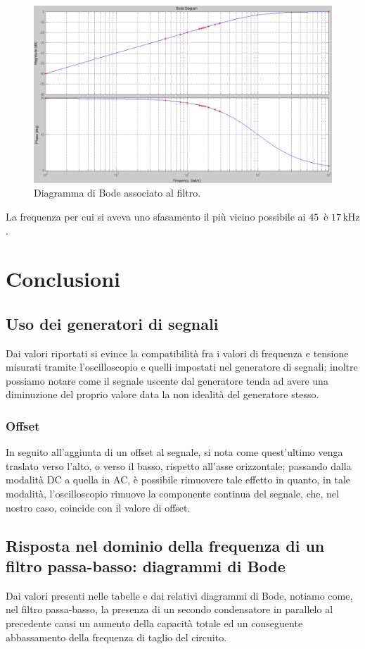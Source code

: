 \documentclass[a4paper]{article}
\begin{document}
			\begin{figure}[h!]
				\centering
				\includegraphics[scale=0.4]{filtroPassaAltoBode}
				\caption{Diagramma di Bode associato al filtro.}
				\label{fig:filtroPassaAltoBode}
			\end{figure}
			\newline
			La frequenza per cui si aveva uno sfasamento il più vicino possibile ai $ 45 $\textdegree \ è $ 17 \, \mathrm{kHz} $.
	\section{Conclusioni}
		\subsection{Uso dei generatori di segnali}
			Dai valori riportati si evince la compatibilità fra i valori di frequenza e tensione misurati tramite l'oscilloscopio e quelli impostati nel generatore di segnali; inoltre possiamo notare come il segnale uscente dal generatore tenda ad avere una diminuzione del proprio valore data la non idealità del generatore stesso.
			\subsubsection{Offset}
				In seguito all’aggiunta di un offset al segnale, si nota come quest’ultimo venga traslato verso l’alto, o verso il basso, rispetto all’asse orizzontale; passando dalla modalità DC a quella in AC, è possibile rimuovere tale effetto in quanto, in tale modalità, l’oscilloscopio rimuove la componente continua del segnale, che, nel nostro caso, coincide con il valore di offset.
		\subsection{Risposta nel dominio della frequenza di un filtro passa-basso: diagrammi di Bode}
			Dai valori presenti nelle tabelle e dai relativi diagrammi di Bode, notiamo come, nel filtro passa-basso, la presenza di un secondo condensatore in parallelo al precedente causi un aumento della capacità totale ed un conseguente abbassamento della frequenza di taglio del circuito.
\end{document}
